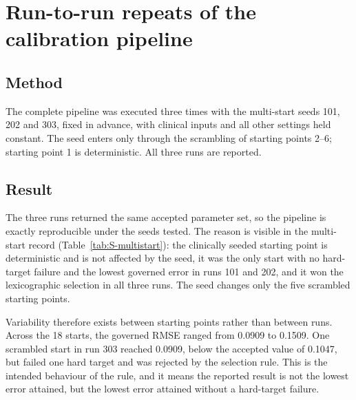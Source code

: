 
\section{Run-to-run repeats of the calibration pipeline}
\label{sec:S-repeats}

\subsection{Method}

The complete pipeline was executed three times with the multi-start seeds
101, 202 and 303, fixed in advance, with clinical inputs and all other
settings held constant. The seed enters only through the scrambling of
starting points 2--6; starting point 1 is deterministic. All three runs are
reported.

\subsection{Result}

The three runs returned the same accepted parameter set, so the pipeline is
exactly reproducible under the seeds tested. The reason is visible in the
multi-start record (Table~\ref{tab:S-multistart}): the clinically seeded
starting point is deterministic and is not affected by the seed, it was the
only start with no hard-target failure and the lowest governed error in runs
101 and 202, and it won the lexicographic selection in all three runs. The
seed changes only the five scrambled starting points.

Variability therefore exists between starting points rather than between
runs. Across the 18 starts, the governed RMSE ranged from 0.0909 to 0.1509.
One scrambled start in run 303 reached 0.0909, below the accepted value of
0.1047, but failed one hard target and was rejected by the selection rule.
This is the intended behaviour of the rule, and it means the reported result
is not the lowest error attained, but the lowest error attained without a
hard-target failure.

